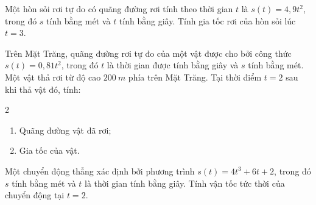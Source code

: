 \begin{bt}%

	Một hòn sỏi rơi tự do có quãng đường rơi tính theo thời gian $t$ là $s(t)=4{,}9 t^2$, trong đó $s$ tính bằng mét và $t$ tính bằng giây. Tính gia tốc rơi của hòn sỏi lúc $t=3$.
\end{bt}

\begin{bt}%

	Trên Mặt Trăng, quãng đường rơi tự đo của một vật được cho bởi công thức $s(t)=0{,}81t^2$, trong đó $t$ là thời gian được tính bằng giây và $s$ tính bằng mét. Một vật thả rơi từ độ cao $200~m$  phía trên Mặt Trăng. Tại thời điểm $t=2$ sau khi thả vật đó, tính:
	\begin{multicols}{2}
		\begin{enumerate}
			\item Quãng đường vật đã rơi;
			\item Gia tốc của vật.
		\end{enumerate}
	\end{multicols}	
\end{bt}

\begin{bt}%

	Một chuyển động thẳng xác định bởi phương trình $s(t)=4 t^3+6 t+2$, trong đó $s$ tính bằng mét và $t$ là thời gian tính bằng giây. Tính vận tốc tức thời của chuyển động tại $t=2$.
\end{bt}

